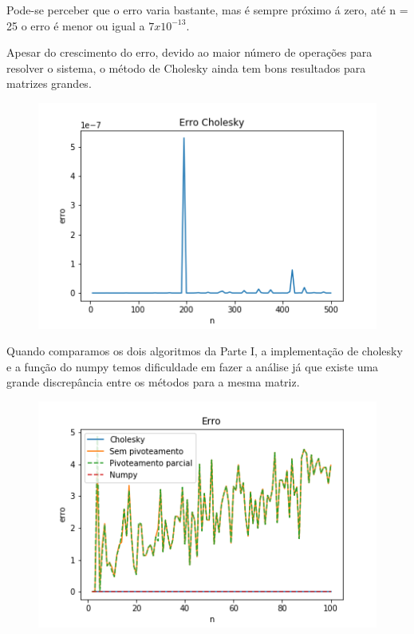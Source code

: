\documentclass{article}
\begin{document}
\par Pode-se perceber que o erro varia bastante, mas é sempre próximo á zero, até n = 25 o erro é menor ou igual a $7 x 10^{-13}$.


\par Apesar do crescimento do erro, devido ao maior número de operações para resolver o sistema, o método de Cholesky ainda tem bons resultados para matrizes grandes.

\begin{figure}[ht]
    \centering
    \includegraphics[scale=0.5]{erro_cholesky4.png}
    \label{fig:my_label}
\end{figure}

\hfill

\par Quando comparamos os dois algoritmos da Parte I, a implementação de cholesky e a função do numpy temos dificuldade em fazer a análise já que existe uma grande discrepância entre os métodos para a mesma matriz.

\begin{figure}[ht]
    \centering
    \includegraphics[scale=0.5]{erro_cholesky2.png}
    \label{fig:my_label}
\end{figure}
\end{document}
